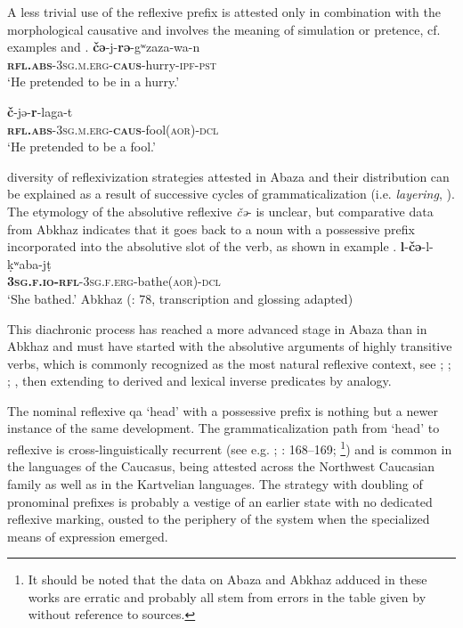 \documentclass[output=paper]{langscibook}
\begin{document}
A less trivial use of the reflexive prefix is attested only in combination with the morphological causative and involves the meaning of simulation or pretence, cf. examples  and .
\ea 
    \label{ex:Arkadiev:57}
    \gll \textbf{{č{ə}}}{{}-j-}\textbf{{r{ə}}}{{}-g{ʷ}zaza-wa-n}
\\
   \textbf{\textsc{rfl.abs}}\textsc{{}-3sg.m.erg-}\textbf{\textsc{caus}}{}-hurry-\textsc{ipf-pst}\\
    \glt ‘He pretended to be in a hurry.’
\z

\ea 
    \label{ex:Arkadiev:58}
    \gll \textbf{{č}}{{}-j{ə}-}\textbf{{r}}{}-laga-t\\
   \textbf{\textsc{rfl.abs}}\textsc{-3sg.m.erg-}\textbf{\textsc{caus}}{}-fool(\textsc{aor)-dcl}\\
    \glt ‘He pretended to be a fool.’
\z
 

 diversity of reflexivization strategies attested in Abaza and their distribution can be explained as a result of successive cycles of grammaticalization (i.e. \textit{layering}, \citealt{Hopper1991}). The etymology of the absolutive reflexive \textit{č{ə}}{}- is unclear, but comparative data from Abkhaz \citep[77--78]{Hewitt1979} indicates that it goes back to a noun with a possessive prefix incorporated into the absolutive slot of the verb, as shown in example . 
\ea 
    \label{ex:Arkadiev:59}
    \gll \textbf{{l}}{{}-}\textbf{{č{ə}}}{{}-l-k{̣}{ʷ}aba-jt{̣}}\\
   \textbf{\textsc{3sg.f.io-rfl}}\textsc{{}-3sg.f.erg}{}-bathe(\textsc{aor)-dcl}\\
    \glt ‘She bathed.’ Abkhaz (\citealt{Hewitt1979}: 78, transcription and glossing adapted)
\z




This diachronic process has reached a more advanced stage in Abaza than in Abkhaz and must have started with the absolutive arguments of highly transitive verbs, which is commonly recognized as the most natural reflexive context, see \citet[3]{Faltz1977}; \citet[42-52]{Kemmer1993}; \citet{Haspelmath2008}; \citet[16--17]{Haspelmath2019constraints}, then extending to derived and lexical inverse predicates by analogy.



The nominal reflexive {qa} ‘head’ with a possessive prefix is nothing but a newer instance of the same development. The grammaticalization path from ‘head’ to reflexive is cross-linguistically recurrent (see e.g. \citealt{Schladt2000}; \citealt{HeineKuteva2002}: 168–169; \citealt{EvseevaSalaberri2018}\footnote{It should be noted that the data on Abaza and Abkhaz adduced in these works are erratic and probably all stem from errors in the table given by \citet[108]{Schladt2000} without reference to sources.}) and is common in the languages of the Caucasus, being attested across the Northwest Caucasian family as well as in the Kartvelian languages. The strategy with doubling of pronominal prefixes is probably a vestige of an earlier state with no dedicated reflexive marking, ousted to the periphery of the system when the specialized means of expression emerged.
\end{document}
